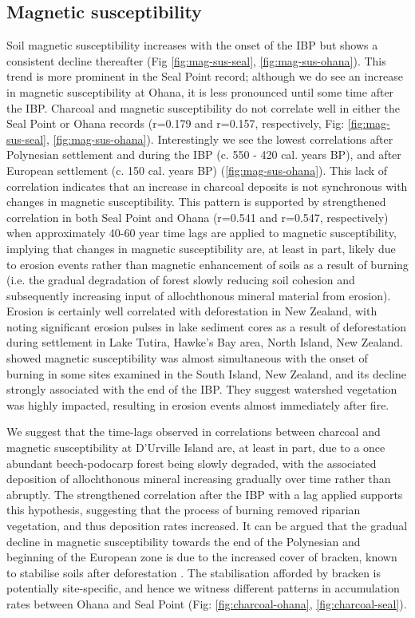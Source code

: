 \documentclass{article}
\begin{document}
\subsection{Magnetic susceptibility}

Soil magnetic susceptibility increases with the onset of the IBP but shows a consistent decline thereafter (Fig \ref{fig:mag-sus-seal}, \ref{fig:mag-sus-ohana}).  This trend is more prominent in the Seal Point record; although we do see an increase in magnetic susceptibility at Ohana, it is less pronounced until some time after the IBP.  Charcoal and magnetic susceptibility do not correlate well in either the Seal Point or Ohana records (r=0.179 and r=0.157, respectively, Fig: \ref{fig:mag-sus-seal}, \ref{fig:mag-sus-ohana}).  Interestingly we see the lowest correlations after Polynesian settlement and during the IBP (c. 550 - 420 cal. years BP), and after European settlement (c. 150 cal. years BP) (\ref{fig:mag-sus-ohana}).  This lack of correlation indicates that an increase in charcoal deposits is not synchronous with changes in magnetic susceptibility.  This pattern is supported by strengthened correlation in both Seal Point and Ohana (r=0.541 and r=0.547, respectively) when approximately 40-60 year time lags are applied to magnetic susceptibility, implying that changes in magnetic susceptibility are, at least in part, likely due to erosion events rather than magnetic enhancement of soils as a result of burning (i.e. the gradual degradation of forest slowly reducing soil cohesion and subsequently increasing input of allochthonous mineral material from erosion). Erosion is certainly well correlated with deforestation in New Zealand, with \cite{wilmshurst1997impact} noting significant erosion pulses in lake sediment cores as a result of deforestation during settlement in Lake Tutira, Hawke's Bay area, North Island, New Zealand. \cite{McWethy2009a} showed magnetic susceptibility was almost simultaneous with the onset of burning in some sites examined in the South Island, New Zealand, and its decline strongly associated with the end of the IBP. They suggest watershed vegetation was highly impacted, resulting in erosion events almost immediately after fire. 

We suggest that the time-lags observed in correlations between charcoal and magnetic susceptibility at D'Urville Island are, at least in part, due to a once abundant beech-podocarp forest being slowly degraded, with the associated deposition of allochthonous mineral increasing gradually over time rather than abruptly.  The strengthened correlation after the IBP with a lag applied supports this hypothesis, suggesting that the process of burning removed riparian vegetation, and thus deposition rates increased.  It can be argued that the gradual decline in magnetic susceptibility towards the end of the Polynesian and beginning of the European zone is due to the increased cover of bracken, known to stabilise soils after deforestation \citep{wilmshurst1997impact,Wilmshurst2005}.  The stabilisation afforded by bracken is potentially site-specific, and hence we witness different patterns in accumulation rates between Ohana and Seal Point (Fig: \ref{fig:charcoal-ohana}, \ref{fig:charcoal-seal}).
      
\end{document}
